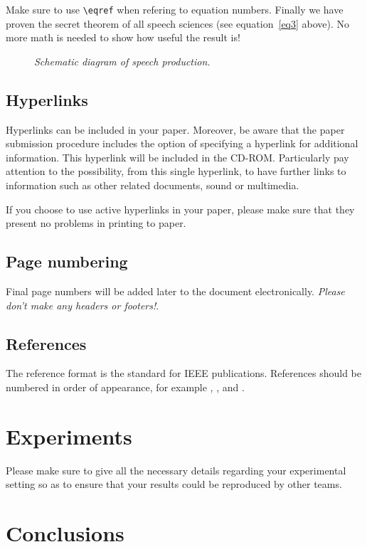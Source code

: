 \documentclass[a4paper]{article}
\begin{document}
Make sure to use \verb!\eqref! when refering to equation numbers.
Finally we have proven the secret theorem of all speech sciences (see
equation~\eqref{eq3} above).  No more math is needed to show how 
useful the result is! 

\begin{figure}[t]
\centerline{}
\caption{{\it Schematic diagram of speech production.}}  
\label{spprod}
\end{figure}

\subsection{Hyperlinks}

Hyperlinks can be included in your paper. Moreover, be aware that the paper
submission procedure includes the option of specifying a hyperlink for
additional information.  This hyperlink will be included in the CD-ROM.
Particularly pay attention to the possibility, from this single hyperlink, to
have further links to information such as other related documents, sound or
multimedia.

If you choose to use active hyperlinks in your paper, 
please make sure that they present no problems in printing to paper. 

\subsection{Page numbering}

Final page numbers will be added later to the document
electronically. 
{\em Please don't make any headers or footers!}.

\subsection{References}

The reference format is the standard for IEEE publications.
References should be numbered in order of appearance, 
for example \cite{ES1}, \cite{ES2}, and \cite{ES3}. 

\section{Experiments}
Please make sure to give all the necessary details regarding your experimental 
setting so as to ensure that your results could be reproduced by other teams. 

\section{Conclusions}
\end{document}
